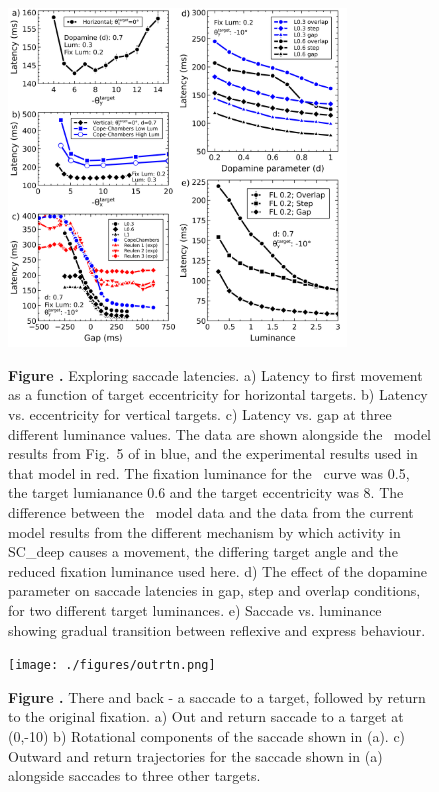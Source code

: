 \documentclass{frontiersSCNS}
\begin{document}
\begin{figure}[htb!]
\begin{center}
\includegraphics[width=0.8\textwidth]{./figures/lat_vs_everything.png}
\end{center}
\textbf{\label{lat_vs_all} Figure .}
{ Exploring saccade latencies. a) Latency to first movement as a
function of target eccentricity for horizontal targets. b) Latency
vs. eccentricity for vertical targets. c) Latency vs. gap at three
different luminance values. The data are shown alongside
the \ccg~model results from Fig.~5 of \cite{cope_basal_2017} in blue,
and the experimental results used in that model in red. The fixation
luminance for the \ccg~curve was 0.5, the target lumianance 0.6 and
the target eccentricity was 8\dg. The difference between
the \ccg~model data and the data from the current model results from
the different mechanism by which activity in SC\_deep causes a
movement, the differing target angle and the reduced fixation
luminance used here. d) The effect
of the dopamine parameter on saccade latencies in gap, step and
overlap conditions, for two different target luminances.  e) Saccade
vs. luminance showing gradual transition between reflexive and express
behaviour.
}
\end{figure}

\begin{figure}[htb!]
\begin{center}
\texttt{[image: ./figures/outrtn.png]}
\end{center}
\textbf{\label{outrtn} Figure .}
{ There and back - a saccade to a target, followed by return to the
original fixation. a) Out and return saccade to a target at (0,-10\dg)
b) Rotational components of the saccade shown in (a). c) Outward and
return trajectories for the saccade shown in (a) alongside saccades to
three other targets.}
\end{figure}
\end{document}
